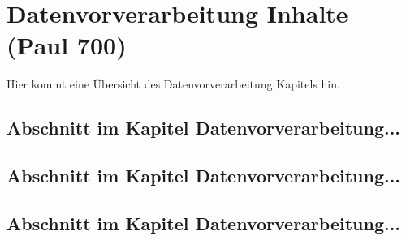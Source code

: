 \chapter{Datenvorverarbeitung Inhalte (Paul 700)}
\label{sec:Kapitel3}

Hier kommt eine Übersicht des Datenvorverarbeitung Kapitels hin.

\section{Abschnitt im Kapitel Datenvorverarbeitung...}
\label{sec:abschnitt3.1}

\section{Abschnitt im Kapitel Datenvorverarbeitung...}

\section{Abschnitt im Kapitel Datenvorverarbeitung...}